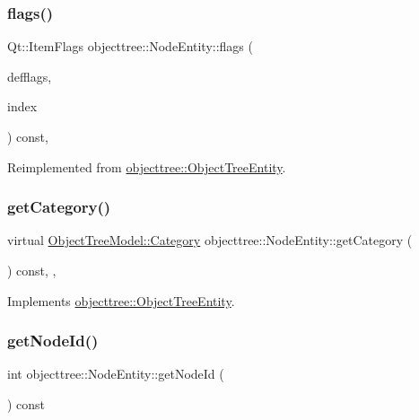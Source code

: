 \subsubsection{\texorpdfstring{flags()}{flags()}}
{\footnotesize\ttfamily Qt\+::\+Item\+Flags objecttree\+::\+Node\+Entity\+::flags (\begin{DoxyParamCaption}\item[{Qt\+::\+Item\+Flags}]{defflags,  }\item[{const Q\+Model\+Index \&}]{index }\end{DoxyParamCaption}) const\hspace{0.3cm}{\ttfamily [override]}, {\ttfamily [virtual]}}



Reimplemented from \mbox{\hyperlink{classobjecttree_1_1_object_tree_entity_a71042bfb5a8328bcbde9d283c0b1b28c}{objecttree\+::\+Object\+Tree\+Entity}}.

\mbox{\label{classobjecttree_1_1_node_entity_abb9330a2e5bc9a6afc6b035d07a3b149}} 
\subsubsection{\texorpdfstring{getCategory()}{getCategory()}}
{\footnotesize\ttfamily virtual \mbox{\hyperlink{class_object_tree_model_a379e9d6b0d381853785adf62095ba4e3}{Object\+Tree\+Model\+::\+Category}} objecttree\+::\+Node\+Entity\+::get\+Category (\begin{DoxyParamCaption}{ }\end{DoxyParamCaption}) const\hspace{0.3cm}{\ttfamily [inline]}, {\ttfamily [override]}, {\ttfamily [virtual]}}



Implements \mbox{\hyperlink{classobjecttree_1_1_object_tree_entity_aa4e80e7fa80672c1b9902add665abc77}{objecttree\+::\+Object\+Tree\+Entity}}.

\mbox{\label{classobjecttree_1_1_node_entity_a9466fa14a33aee9c2953fb57313b0735}} 
\subsubsection{\texorpdfstring{getNodeId()}{getNodeId()}}
{\footnotesize\ttfamily int objecttree\+::\+Node\+Entity\+::get\+Node\+Id (\begin{DoxyParamCaption}{ }\end{DoxyParamCaption}) const\hspace{0.3cm}{\ttfamily [inline]}}

